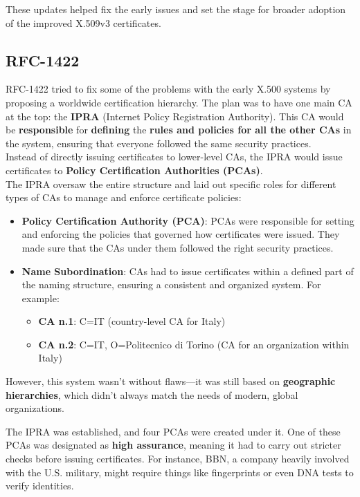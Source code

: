 These updates helped fix the early issues and set the stage for
broader adoption of the improved X.509v3 certificates.

\subsection{RFC-1422}
RFC-1422 tried to fix some of the problems with the early X.500
systems by proposing a worldwide certification hierarchy. The plan was
to have one main CA at the top: the \textbf{IPRA} (Internet Policy
Registration Authority). This CA would be \textbf{responsible} for
\textbf{defining} the \textbf{rules and policies for all the other
CAs} in the system, ensuring that everyone followed the same security
practices.\\
Instead of directly issuing certificates to lower-level CAs, the IPRA
would issue certificates to \textbf{Policy Certification Authorities
(PCAs)}.\\
The IPRA oversaw the entire structure and laid out specific roles for
different types of CAs to manage and enforce certificate policies:

\begin{itemize}
  \item \textbf{Policy Certification Authority (PCA)}: PCAs were
    responsible for setting and enforcing the policies that governed
    how certificates were issued. They made sure that the CAs under
    them followed the right security practices.
  
  \item \textbf{Name Subordination}: CAs had to issue certificates
    within a defined part of the naming structure, ensuring a
    consistent and organized system. For example:
  \begin{itemize}
      \item \textbf{CA n.1}: C=IT (country-level CA for Italy)
      \item \textbf{CA n.2}: C=IT, O=Politecnico di Torino (CA for an
        organization within Italy)
  \end{itemize}
\end{itemize}


However, this system wasn’t without flaws—it was still based on
\textbf{geographic hierarchies}, which didn’t always match the needs
of modern, global organizations.

The IPRA was established, and four PCAs were created under it. One of
these PCAs was designated as \textbf{high assurance}, meaning it had
to carry out stricter checks before issuing certificates. For
instance, BBN, a company heavily involved with the U.S. military,
might require things like fingerprints or even DNA tests to verify
identities.

